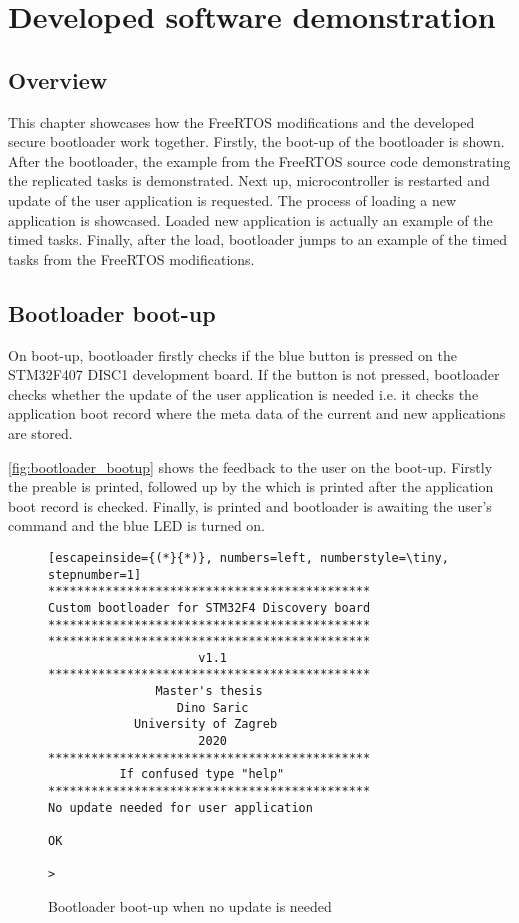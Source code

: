 \chapter{Developed software demonstration}
\label{demonstration}

\section{Overview}

This chapter showcases how the FreeRTOS modifications and the developed secure bootloader work together. Firstly, the boot-up of the bootloader is shown. After the bootloader, the example from the FreeRTOS source code demonstrating the replicated tasks is demonstrated. Next up, microcontroller is restarted and update of the user application is requested. The process of loading a new application is showcased. Loaded new application is actually an example of the timed tasks. Finally, after the load, bootloader jumps to an example of the timed tasks from the FreeRTOS modifications.

\section{Bootloader boot-up}

On boot-up, bootloader firstly checks if the blue button is pressed on the STM32F407 DISC1 development board. If the button is not pressed, bootloader checks whether the update of the user application is needed i.e. it checks the application boot record where the meta data of the current and new applications are stored.

\autoref{fig:bootloader_bootup} shows the feedback to the user on the boot-up. Firstly the preable is printed, followed up by the  which is printed after the application boot record is checked. Finally, \code{>} is printed and bootloader is awaiting the user's command and the blue LED is turned on.

\begin{figure}[H]
\begin{changemargin}{1cm}{1cm}
\begin{lstlisting}[escapeinside={(*}{*)}, numbers=left, numberstyle=\tiny, stepnumber=1]
*********************************************
Custom bootloader for STM32F4 Discovery board
*********************************************
*********************************************
                     v1.1
*********************************************
               Master's thesis
                  Dino Saric
            University of Zagreb
                     2020
*********************************************
          If confused type "help"          
*********************************************
No update needed for user application

OK

>
\end{lstlisting}  
\end{changemargin}
\caption{Bootloader boot-up when no update is needed}
\label{fig:bootloader_bootup}
\end{figure}

